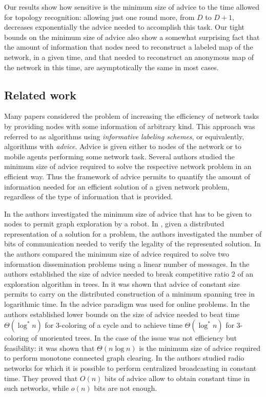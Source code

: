 \documentclass{article}
\begin{document}
Our results show how sensitive is the minimum
size of advice to the time allowed for topology recognition: allowing just one round more, from $D$
to $D+1$, decreases exponentially the advice needed to accomplish this task.
Our tight bounds on the minimum size of advice also show a somewhat surprising fact that the amount of information that nodes need to reconstruct a labeled map of the network, in a given time, and that needed to reconstruct an anonymous map of the network in this time, are asymptotically the same in most cases.



\subsection{Related work}
{Many papers \cite{AKM01,CFP,CFIKP,DP,EFKR,FGIP,FIP1,FIP2,FKL,FP,GPPR02,IKP,KKKP02,KKP05,SN,TZ05} considered the problem of increasing the efficiency of network tasks by providing nodes with some information of arbitrary kind.}
This approach was referred to as
algorithms using {\em informative labeling schemes}, or equivalently, algorithms with {\em advice}.  
Advice is given either to nodes of the network or to mobile agents performing some network task.
Several authors studied the minimum size of advice required to solve the
respective network problem in an efficient way. Thus the framework of advice permits to quantify the amount of information
needed for an efficient solution of a given network problem, regardless of the type of information that is provided.

In \cite{CFIKP} the authors investigated the minimum size of advice that has to be given to nodes
to permit graph exploration by a robot. 
 In \cite{KKP05}, given a distributed representation of a solution for a problem,
the authors investigated the number of bits of communication needed to verify the legality of the represented solution.
In \cite{FIP1} the authors compared the minimum size of advice required to
solve two information dissemination problems using a linear number of messages. In \cite{FIP2} the authors
established the size of advice needed to break competitive ratio 2 of an exploration algorithm in trees.
In \cite{FKL} it was shown that advice of constant size permits to carry on the distributed construction of a minimum
spanning tree in logarithmic time. 
In \cite{EFKR} the advice paradigm was used for online problems.
In \cite{FGIP} the authors established lower bounds on the size of advice 
needed to beat time $\Theta(\log^*n)$
for 3-coloring of a cycle and to achieve time $\Theta(\log^*n)$ for 3-coloring of unoriented trees.  
In the case of \cite{SN} the issue was not efficiency but feasibility: it
was shown that $\Theta(n\log n)$ is the minimum size of advice
required to perform monotone connected graph clearing.
In \cite{IKP} the authors studied radio networks for
which it is possible to perform centralized broadcasting in constant time. They proved that
$O(n)$ bits of advice allow to obtain constant time in such networks, while
$o(n)$ bits are not enough. 
\end{document}
